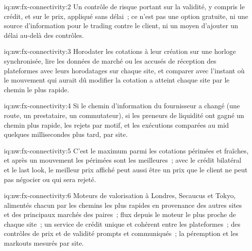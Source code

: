 \begin{solution}{iq:nw:fx-connectivity:2}
Un contrôle de risque portant sur la validité, y compris le crédit, et sur le prix, appliqué sans délai~; ce n'est pas une option gratuite, ni une source d'information pour le trading
contre le client, ni un moyen d'ajouter un délai au-delà des contrôles.
\end{solution}

\begin{solution}{iq:nw:fx-connectivity:3}
Horodater les cotations à leur création sur une horloge synchronisée, lire les données de marché ou les accusés de réception des plateformes avec leurs horodatages sur chaque site,
et comparer avec l'instant où le mouvement qui aurait dû modifier la cotation a atteint chaque site par le chemin le plus rapide.
\end{solution}

\begin{solution}{iq:nw:fx-connectivity:4}
Si le chemin d'information du fournisseur a changé (une route, un prestataire, un commutateur), si les preneurs de liquidité ont gagné un chemin plus rapide, les rejets par motif,
et les exécutions comparées au mid quelques millisecondes plus tard, par site.
\end{solution}

\begin{solution}{iq:nw:fx-connectivity:5}
C'est le maximum parmi les cotations périmées et fraîches, et après un mouvement les périmées sont les meilleures~; avec le crédit bilatéral et le last look, le meilleur
prix affiché peut aussi être un prix que le client ne peut pas négocier ou qui sera rejeté.
\end{solution}

\begin{solution}{iq:nw:fx-connectivity:6}
Moteurs de valorisation à Londres, Secaucus et Tokyo, alimentés chacun par les chemins les plus rapides en provenance des autres sites et des principaux marchés des paires~; flux depuis
le moteur le plus proche de chaque site~; un service de crédit unique et cohérent entre les plateformes~; des contrôles de prix et de validité prompts et communiqués~; la péremption et
les markouts mesurés par site.
\end{solution}
